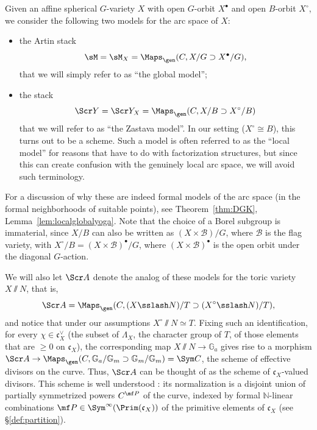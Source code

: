 Given an affine spherical $G$-variety $X$ with open $G$-orbit $X^\bullet$ and open $B$-orbit $X^\circ$, we consider the following two models for the arc space of $X$:
\begin{itemize}
 \item the Artin stack
\[ \sM= \sM_{X} = \Maps_\gen(C, X/ G \supset X^\bullet /G), \]
that we will simply refer to as ``the global model'';
 \item the stack
\[ \Scr Y=   \Scr Y_{X} = \Maps_\gen(C, X/B \supset X^\circ/B)  \]
that we will refer to as ``the Zastava model''. In our setting ($X^\circ\cong B$), this turns out to be a scheme. Such a model is often referred to as the ``local model'' for reasons that have to do with factorization structures, but since this can create confusion with the genuinely local arc space, we will avoid such terminology.
\end{itemize}
For a discussion of why these are indeed formal models of the arc space (in the formal neighborhoods of suitable points), see Theorem~\ref{thm:DGK}, Lemma~\ref{lem:localglobalyoga}.
Note that the choice of a Borel subgroup is immaterial, since $X/B$ can also be written as $(X\times \mathcal B)/G$, where $\mathcal B$ is the flag variety, with $X^\circ/B = (X\times \mathcal B)^\bullet/G$, where $(X\times \mathcal B)^\bullet$ is the open
orbit under the diagonal $G$-action.

We will also let $\Scr A$ denote the analog of these models for the toric variety $X\sslash N$, that is,
\[    \Scr A = \Maps_\gen(C, (X\sslash N)/T \supset (X^\circ\sslash N)/T),  \]
and notice that under our assumptions $X^\circ\sslash N\simeq T$. Fixing such an identification, for every $\chi\in \mathfrak c_X^\vee$
(the subset of $\Lambda_X$, the character group of $T$, of those elements that are $\ge 0$ on $\mathfrak c_X$), the corresponding map $X\sslash N\to \mathbb G_a$ gives rise to a morphism $\Scr A \to \Maps_\gen(C, \mathbb G_a/\mathbb G_m \supset \mathbb G_m/\mathbb G_m) = \Sym C$, the scheme of effective divisors on the curve. Thus, $\Scr A$ can be thought of as the scheme of $\mathfrak c_X$-valued divisors. This scheme is well understood \cite{BNS}: its normalization is a disjoint union of partially symmetrized powers $C^{\mf P}$ of the curve, indexed by formal $\mathbb N$-linear combinations $\mf P\in \Sym^\infty(\Prim(\mathfrak c_X))$ of the primitive elements of $\mathfrak c_X$ (see \S\ref{def:partition}).



